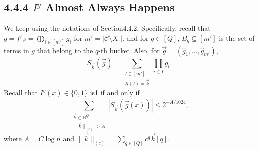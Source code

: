 \documentclass[10pt,a4paper]{article}
\begin{document}
\subsection*{4.4.4 $I^g$ Almost Always Happens}
We keep using the notations of Section4.4.2. Specifically, recall that $g=f'_{\mathcal B}=\bigoplus_{i\in[m']}g_i$ for $m'=|\mathcal C\setminus X_z|$, and for $q\in[Q]$, $B_q\subseteq[m']$ is the set of terms in $g$ that belong to the $q$-th bucket. Also, for $\vec g=(\widehat g_1,\ldots,\widehat g_{m'})$,
\[
S_{\vec k}(\vec g)=\sum_{\substack{I\subseteq[m']\\K(I)=\vec k}}\prod_{i\in I}\widehat g_i.
\]
Recall that $I^g(x)\in\{0,1\}$ is1 if and only if
\[
\sum_{\substack{\vec k\in\mathbb N^Q\\\|\vec k\|_{(c)}>A}}|S_{\vec k}(\vec g(x))|\le2^{-A/1024},
\]
where $A=\bar C\log n$ and $\|\vec k\|_{(c)}=\sum_{q\in[Q]}c^q\vec k[q]$.
\end{document}

